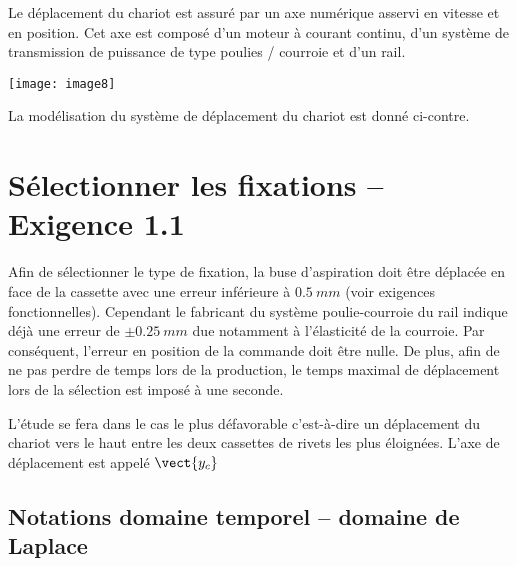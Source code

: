 Le déplacement du chariot est assuré par un axe numérique asservi en vitesse et en position. Cet axe est composé d'un moteur à courant continu, d'un système de transmission de puissance de type poulies / courroie et d'un rail.

\begin{marginfigure}
\texttt{[image: image8]}
\end{marginfigure} 
 
La modélisation du système de déplacement du chariot est donné ci-contre.

\fi




\section*{Sélectionner les fixations – Exigence 1.1}
\ifprof
\else 
Afin de sélectionner le type de fixation, la buse d'aspiration doit être déplacée en face de la cassette avec une erreur inférieure à $\SI{0,5}{mm}$ (voir exigences fonctionnelles). Cependant le fabricant du système poulie-courroie du rail indique déjà une erreur de $\pm \SI{0,25}{mm}$ due notamment à l'élasticité de la courroie. Par conséquent, l'erreur en position de la commande doit être nulle. De plus, afin de ne pas perdre de temps lors de la production, le temps maximal de déplacement lors de la sélection est imposé à une seconde.

L'étude se fera dans le cas le plus défavorable c'est-à-dire un déplacement du chariot vers le haut entre les deux cassettes de rivets les plus éloignées. L'axe de déplacement est appelé $\vect{y_c}$
\subsection*{Notations domaine temporel – domaine de Laplace}



